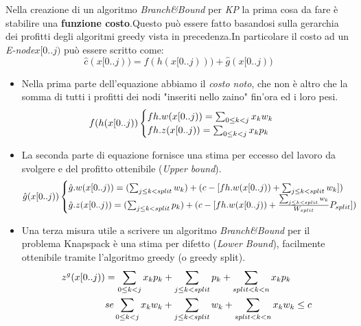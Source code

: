 \documentclass[a4paper]{article}
\begin{document}
Nella creazione di un algoritmo \textit{Branch\&Bound} per \emph{KP} la prima cosa da fare è stabilire una \textbf{funzione costo}.Questo può essere fatto basandosi sulla gerarchia dei profitti degli algoritmi greedy vista in precedenza.In particolare il costo ad un \textit{E-node}$x[0..j)$ può essere scritto come:
$$\hat{c}(x[0..j)) = f(h(x[0..j))) + \hat{g}(x[0..j))$$
\begin{itemize}
	\item Nella prima parte dell'equazione abbiamo il \textit{costo noto}, che non è altro che la somma di tutti i profitti dei nodi "inseriti nello zaino" fin'ora ed i loro pesi. 
		\begin{equation}
                	f(h(x[0..j))\begin{cases}
			fh.w(x[0..j))= \sum_{0\leq k < j} x_{k}w_{k}\\
			fh.z(x[0..j))= \sum_{0\leq k < j} x_{k}p_{k}\notag
                \end{cases}
	        \end{equation}
	\item La seconda parte di equazione fornisce una stima per eccesso del lavoro da svolgere e del profitto ottenibile (\textit{Upper bound}).
		\begin{equation}
			\hat{g}(x[0..j))\begin{cases}
				\hat{g}.w(x[0..j))= (\sum_{j\leq k < split} w_{k})+(c-[fh.w(x[0..j)) + \sum_{j\leq k < split} w_{k}])\\
				\hat{g}.z(x[0..j))= (\sum_{j\leq k < split} p_{k})+(c-[fh.w(x[0..j)) + \frac{\sum_{j\leq k < split} w_{k}}{W_{split}}P_{split}]) \notag
                	\end{cases}
	        \end{equation}
	\item Una terza misura utile a scrivere un algoritmo \textit{Branch\&Bound} per il problema Knapspack è una stima per difetto (\textit{Lower Bound}), facilmente ottenibile tramite l'algoritmo greedy (o greedy split).
		\begin{align}
				z^g(x[0..j)) &= \sum_{0\leq k < j} x_{k}p_{k} + \sum_{j\leq k < split} p_{k} + \sum_{split < k < n} x_{k}p_{k} \notag \\
			&se \sum_{0\leq k < j} x_{k}w_{k} + \sum_{j\leq k < split} w_{k} + \sum_{split < k < n} x_{k}w_{k} \leq c \notag
		\end{align}
\end{itemize}
\end{document}
